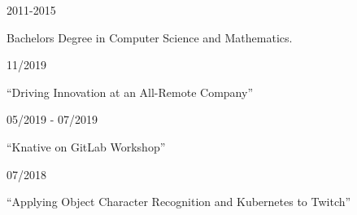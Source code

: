 \documentclass[12pt]{article} %
\begin{document}

\begin{description}
\squish
{}
           {}
           {2011-2015}

Bachelors Degree in Computer Science and Mathematics.
\end{description}


\begin{description}
\squish

           {}
           {11/2019}

    ``Driving Innovation at an All-Remote Company''

           {}
           {05/2019 - 07/2019}

    ``Knative on GitLab Workshop''

           {}
           {07/2018}

    ``Applying Object Character Recognition and Kubernetes to Twitch''

\end{description}
\end{document}
